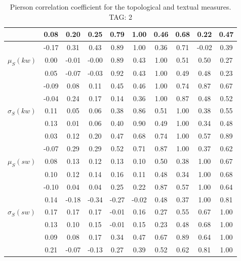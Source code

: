 \begin{table*}[h!]
\begin{center}
\begin{tabular}{| l | c | c | c | c | c | c | c | c | c |}
 & 0.08  & 0.20  & 0.25  & 0.79  & 1.00  & 0.46  & 0.68  & 0.22  & 0.47 \\\hline
 & -0.17  & 0.31  & 0.43  & 0.89  & 1.00  & 0.36  & 0.71  & -0.02  & 0.39 \\\hline
$\mu_S(kw)$ & 0.00  & -0.01  & -0.00  & 0.89  & 0.43  & 1.00  & 0.51  & 0.50  & 0.27 \\\hline
 & 0.05  & -0.07  & -0.03  & 0.92  & 0.43  & 1.00  & 0.49  & 0.48  & 0.23 \\\hline
 & -0.09  & 0.08  & 0.11  & 0.45  & 0.46  & 1.00  & 0.74  & 0.87  & 0.67 \\\hline
 & -0.04  & 0.24  & 0.17  & 0.14  & 0.36  & 1.00  & 0.87  & 0.48  & 0.52 \\\hline
$\sigma_S(kw)$ & 0.11  & 0.05  & 0.06  & 0.38  & 0.86  & 0.51  & 1.00  & 0.38  & 0.55 \\\hline
 & 0.13  & 0.01  & 0.06  & 0.40  & 0.90  & 0.49  & 1.00  & 0.34  & 0.48 \\\hline
 & 0.03  & 0.12  & 0.20  & 0.47  & 0.68  & 0.74  & 1.00  & 0.57  & 0.89 \\\hline
 & -0.07  & 0.29  & 0.29  & 0.52  & 0.71  & 0.87  & 1.00  & 0.37  & 0.62 \\\hline
$\mu_S(sw)$ & 0.08  & 0.13  & 0.12  & 0.13  & 0.10  & 0.50  & 0.38  & 1.00  & 0.67 \\\hline
 & 0.10  & 0.12  & 0.14  & 0.16  & 0.11  & 0.48  & 0.34  & 1.00  & 0.68 \\\hline
 & -0.10  & 0.04  & 0.04  & 0.25  & 0.22  & 0.87  & 0.57  & 1.00  & 0.64 \\\hline
 & 0.14  & -0.18  & -0.34  & -0.27  & -0.02  & 0.48  & 0.37  & 1.00  & 0.81 \\\hline
$\sigma_S(sw)$ & 0.17  & 0.17  & 0.17  & -0.01  & 0.16  & 0.27  & 0.55  & 0.67  & 1.00 \\\hline
 & 0.13  & 0.10  & 0.15  & -0.01  & 0.15  & 0.23  & 0.48  & 0.68  & 1.00 \\\hline
 & 0.09  & 0.08  & 0.17  & 0.34  & 0.47  & 0.67  & 0.89  & 0.64  & 1.00 \\\hline
 & 0.21  & -0.07  & -0.13  & 0.27  & 0.39  & 0.52  & 0.62  & 0.81  & 1.00 \\\hline
\end{tabular}
\caption{Pierson correlation coefficient for the topological and textual measures. TAG: 2}
\end{center}
\end{table*}